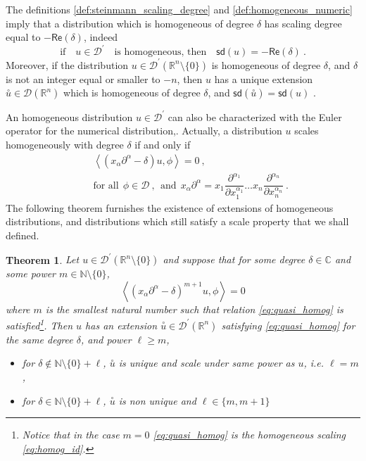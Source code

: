 \documentclass[11pt]{book}
\newcommand{\sd}{\mathsf{sd}}
\renewcommand{\Re}{\mathsf{Re}}
\newcommand{\sm}[1]{\left\langle#1\right\rangle}
\newcommand{\exte}[1]{\overset{\circ}{#1}}
\newcommand{\Dcal}{\mathcal{D}}
\newcommand{\Cbb}{\mathbb{C}}
\newcommand{\Nbb}{\mathbb{N}}
\newcommand{\Rbb}{\mathbb{R}}
\theoremstyle{break}
\newtheorem{theorem}{Theorem}[chapter]
\begin{document}
The definitions \ref{def:steinmann_scaling_degree} and \ref{def:homogeneous_numeric} imply that a distribution which is homogeneous of degree $\delta$ has scaling degree equal to $-\Re(\delta)$, indeed
%
\begin{equation}
\mbox{if} \quad u \in \Dcal^\prime \quad \mbox{is homogeneous, then} \quad \sd(u) = -\Re(\delta) \ .
\end{equation}
%
Moreover, if the distribution $u \in \Dcal^\prime(\Rbb^n\setminus \{0\})$ is homogeneous of degree $\delta$, and $\delta$ is not an integer equal or smaller to $-n$, then $u$ has a unique extension $\exte{u} \in \Dcal(\Rbb^n)$ which is homogeneous of degree $\delta$, and $\sd(\exte{u})=\sd(u)$ \cite{HORMANDER_1990}.


An homogeneous distribution $u \in \Dcal^\prime$ can also be characterized with the Euler operator for the numerical distribution,. Actually, a distribution $u$ scales homogeneously with degree $\delta$ if and only if 
%
\begin{eqnarray*}
&& \sm{\left(x_\alpha \partial^\alpha - \delta \right) u ,\phi} =  0 \ , \\
&& \mbox{for all} \ \ \phi \in \Dcal \ , \ \ \mbox{and} \ \ x_\alpha \partial^\alpha = x_1 \dfrac{\partial^{\alpha_1}}{\partial x_1^{\alpha_1}} \dots x_n \dfrac{\partial^{\alpha_n}}{\partial x_n^{\alpha_n}} \ .
\end{eqnarray*}
%
The following theorem furnishes the existence of extensions of homogeneous distributions, and distributions which still satisfy a scale property that we shall defined.
%
\begin{theorem}\label{theo:almost_homo_numeric}
Let $u \in \Dcal^\prime(\Rbb^n\setminus\{0\})$ and suppose that for some degree $\delta\in\Cbb$ and some power $m\in\Nbb\setminus\{0\}$, 
%
\begin{equation}
\sm{\left(x_\alpha \partial^\alpha - \delta \right)^{m+1} u , \phi } =  0
\label{eq:quasi_homog}
\end{equation}
%
where $m$ is the smallest natural number such that relation \eqref{eq:quasi_homog} is satisfied\footnote{Notice that in the case $m=0$ \eqref{eq:quasi_homog} is the homogeneous scaling \eqref{eq:homog_id}.}. Then $u$ has an extension $\exte{u}\in\Dcal^\prime(\Rbb^n)$ satisfying \eqref{eq:quasi_homog} for the same degree $\delta$, and power $\ell \geq m$,
%
\begin{itemize}
\item for $\delta \notin \Nbb \setminus \{0\} + \ell$, $\exte{u}$ is unique and scale under same power as $u$, i.e. $\ell=m$,
%
\item for $\delta \in \Nbb \setminus \{0\} + \ell$, $\exte{u}$ is non unique and $\ell\in\{ m , m+1 \}$
\end{itemize}
%
\end{theorem}
\end{document}
